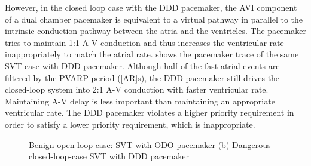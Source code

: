 However, in the closed loop case with the DDD pacemaker, the AVI component of a dual chamber pacemaker is equivalent to a virtual pathway in parallel to the intrinsic conduction pathway between the atria and the ventricles. The pacemaker tries to maintain 1:1 A-V conduction and thus increases the ventricular rate inappropriately to match the atrial rate.  shows the pacemaker trace of the same SVT case with DDD pacemaker. Although half of the fast atrial events are filtered by the PVARP period ([AR]s), the DDD pacemaker still drives the closed-loop system into 2:1 A-V conduction with faster ventricular rate. Maintaining A-V delay is less important than maintaining an appropriate ventricular rate. The DDD pacemaker violates a higher priority requirement in order to satisfy a lower priority requirement, which is inappropriate.
\begin{figure}[!t]
\centering
\vspace{-10pt}
		
\vspace{-10pt}
\caption{\small Benign open loop case: SVT with ODO pacemaker (b) Dangerous closed-loop-case SVT with DDD pacemaker}
\end{figure} 


